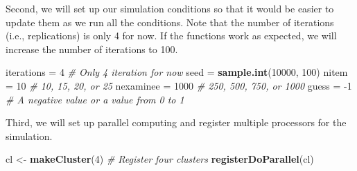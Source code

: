 \documentclass[
]{book}
\newenvironment{Shaded}{\begin{snugshade}}{\end{snugshade}}
\newcommand{\CommentTok}[1]{\textcolor[rgb]{0.56,0.35,0.01}{\textit{#1}}}
\newcommand{\ControlFlowTok}[1]{\textcolor[rgb]{0.13,0.29,0.53}{\textbf{#1}}}
\newcommand{\DataTypeTok}[1]{\textcolor[rgb]{0.13,0.29,0.53}{#1}}
\newcommand{\DecValTok}[1]{\textcolor[rgb]{0.00,0.00,0.81}{#1}}
\newcommand{\KeywordTok}[1]{\textcolor[rgb]{0.13,0.29,0.53}{\textbf{#1}}}
\newcommand{\NormalTok}[1]{#1}
\newcommand{\OperatorTok}[1]{\textcolor[rgb]{0.81,0.36,0.00}{\textbf{#1}}}
\newcommand{\StringTok}[1]{\textcolor[rgb]{0.31,0.60,0.02}{#1}}
\begin{document}
\begin{Shaded}
\end{Shaded}

Second, we will set up our simulation conditions so that it would be easier to update them as we run all the conditions. Note that the number of iterations (i.e., replications) is only 4 for now. If the functions work as expected, we will increase the number of iterations to 100.

\begin{Shaded}
\begin{Highlighting}[]
\NormalTok{iterations =}\StringTok{ }\DecValTok{4} \CommentTok{# Only 4 iteration for now}
\NormalTok{seed =}\StringTok{ }\KeywordTok{sample.int}\NormalTok{(}\DecValTok{10000}\NormalTok{, }\DecValTok{100}\NormalTok{)}
\NormalTok{nitem =}\StringTok{ }\DecValTok{10} \CommentTok{# 10, 15, 20, or 25}
\NormalTok{nexaminee =}\StringTok{ }\DecValTok{1000} \CommentTok{# 250, 500, 750, or 1000}
\NormalTok{guess =}\StringTok{ }\DecValTok{-1} \CommentTok{# A negative value or a value from 0 to 1}
\end{Highlighting}
\end{Shaded}

Third, we will set up parallel computing and register multiple processors for the simulation.

\begin{Shaded}
\begin{Highlighting}[]
\NormalTok{cl <-}\StringTok{ }\KeywordTok{makeCluster}\NormalTok{(}\DecValTok{4}\NormalTok{) }\CommentTok{# Register four clusters}
\KeywordTok{registerDoParallel}\NormalTok{(cl)}
\end{Highlighting}
\end{Shaded}
\end{document}

